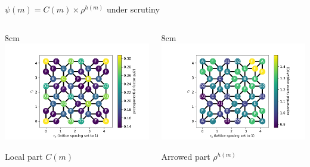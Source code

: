 \documentclass[xcolor=x11names,compress,professionalfonts, aspectratio=169]{beamer}
\renewcommand{\(}{\begin{columns}}
\renewcommand{\)}{\end{columns}}
\newcommand{\<}[1]{\begin{column}{#1}}
\renewcommand{\>}{\end{column}}
\begin{document}
\begin{frame}{$\psi(m) = C(m) \times \rho^{h(m)}$ under scrutiny}

\begin{columns}
\<{8cm}
\centering
\includegraphics[scale=.5]{img/SKK_cake_2_para.pdf}

Local part $C(m)$
\>
\<{8cm}
\centering
\includegraphics[scale=.5]{img/SKK_exponential_2_para.pdf}

Arrowed part  $\rho^{h(m)}$
\>
\end{columns}

\newcommand{\s}{.11}
{

\centering

}
\end{frame}
\end{document}
